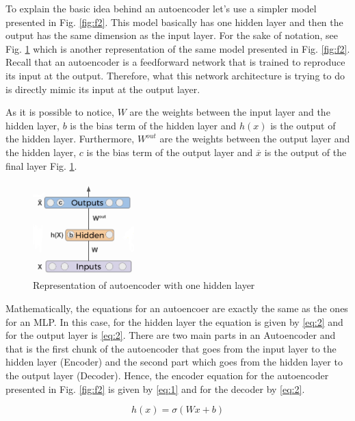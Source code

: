 \documentclass{article}
\begin{document}
To explain the basic idea behind an autoencoder let's use a simpler model presented in Fig. \ref{fig:f2}. This model basically has one hidden layer and then the output has the same dimension as the input layer. For the sake of notation, see Fig. \ref{fig:f3} which is another representation of the same model presented in Fig. \ref{fig:f2}. Recall that an autoencoder is a feedforward network that is trained to reproduce its input at the output. Therefore, what this network architecture is trying to do is directly mimic its input at the output layer.


As it is possible to notice, \(W\) are the weights between the input layer and the hidden layer, \(b\) is the bias term of the hidden layer and \(h(x)\) is the output of the hidden layer. Furthermore, \(W^{out}\) are the weights between the output layer and the hidden layer, \(c\) is the bias term of the output layer and \(\overline{x}\) is the output of the final layer Fig. \ref{fig:f3}. 

\begin{figure}[ht]
    \centering
    \includegraphics[width=0.35\textwidth,height=0.35\textheight,keepaspectratio]{images/architecture.png}
    \captionsetup{justification=centering}
    \caption{Representation of autoencoder with one hidden layer}
    \label{fig:f3}
\end{figure}

Mathematically, the equations for an autoencoer are exactly the same as the ones for an MLP. In this case, for the hidden layer the equation is given by \eqref{eq:2} and for the output layer is \eqref{eq:2}. There are two main parts in an Autoencoder and that is the first chunk of the autoencoder that goes from the input layer to the hidden layer (Encoder) and the second part which goes from the hidden layer to the output layer (Decoder). Hence, the encoder equation for the autoencoder presented in Fig. \ref{fig:f2} is given by \eqref{eq:1} and for the decoder by \eqref{eq:2}.

\begin{equation}
h(x) = \sigma(Wx + b)
\label{eq:1}
\end{equation}
\end{document}
